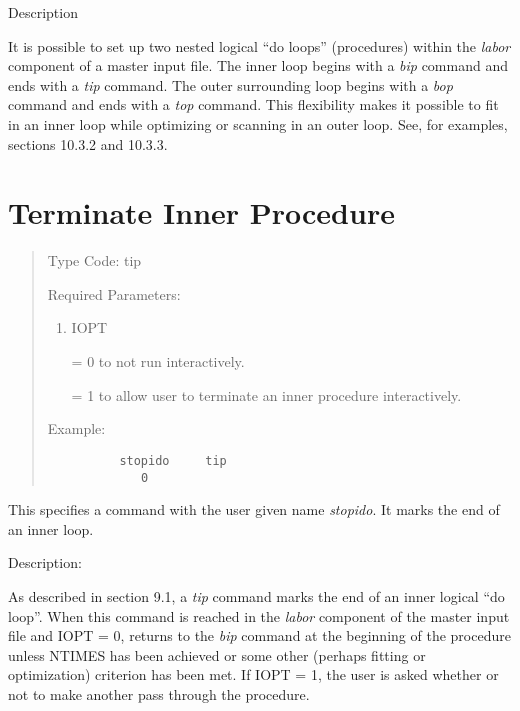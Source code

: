 \vspace{5mm}
     Description
\vspace{2mm}

It is possible to set up two nested logical ``do loops'' (procedures) within the {\em labor} component of a \Mary master input file.  The inner loop begins with a {\em bip} command and ends with a {\em tip} command.  The outer surrounding loop begins with a {\em bop} command and ends with a {\em top} command.  This flexibility makes it possible to fit in an inner loop while optimizing or scanning in an outer loop.  See, for examples, sections 10.3.2 and 10.3.3.

\newpage
\section{Terminate Inner Procedure} 
\begin{quotation}
\noindent Type Code:  tip
\vspace{5mm}

\noindent Required Parameters:
\begin{enumerate}
  \item  IOPT

         = 0 to not run interactively.

         = 1 to allow user to terminate an inner procedure interactively.
\end{enumerate}
\vspace{5mm}
\noindent Example:
\begin{verbatim}
          stopido     tip
             0
\end{verbatim}
\end{quotation}
This specifies a command with the user given name {\em stopido}.  It marks the end of an inner loop.

\vspace{5mm}
     Description:
\vspace{2mm}

As described in section 9.1, a {\em tip} command marks the end of an inner logical ``do loop''.  When this command is reached in the {\em labor} component of the master input file and IOPT = 0, \Mary returns to the {\em bip} command at the beginning of the procedure unless NTIMES has been achieved or some other (perhaps fitting or optimization) criterion has been met.  If IOPT = 1, the user is asked whether or not to make another pass through the procedure.

\newpage

